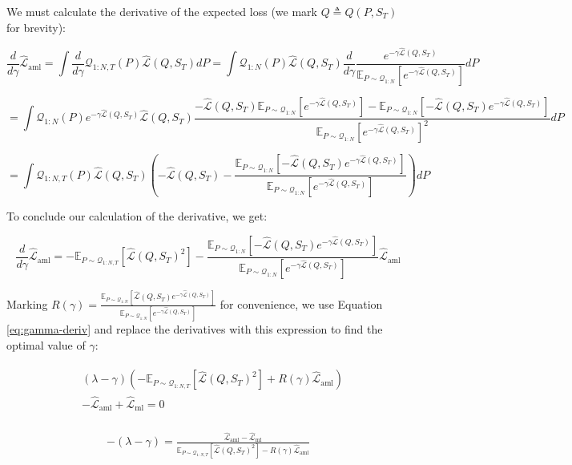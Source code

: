 \documentclass{article}
\theoremstyle{definition}
\newcommand{\Expect}[2]{\mathbb{E}_{#1}\left [#2 \right ]}
\begin{document}
We must calculate the derivative of the expected loss (we mark $Q\triangleq Q(P,S_T)$ for brevity): 

$$\frac{d}{d\gamma}\hat{\mathcal{L}}_{\mathrm{aml}}=\int \frac{d}{d\gamma}\mathcal{Q}_{1:N,T}(P)\hat{\mathcal{L}}(Q, S_T)dP=\int \mathcal{Q}_{1:N}(P)\hat{\mathcal{L}}(Q, S_T)\frac{d}{d\gamma}
\frac{e^{-\gamma\hat{\mathcal{L}}(Q,S_T)}}{\Expect{P\sim \mathcal{Q}_{1:N}}{e^{-\gamma\hat{\mathcal{L}}(Q,S_T)}}}dP$$

$$=\int \mathcal{Q}_{1:N}(P)e^{-\gamma\hat{\mathcal{L}}(Q,S_T)}\hat{\mathcal{L}}(Q, S_T)\frac{-\hat{\mathcal{L}}(Q,S_T)\Expect{P\sim \mathcal{Q}_{1:N}}{e^{-\gamma\hat{\mathcal{L}}(Q,S_T)}}
	-\Expect{P\sim \mathcal{Q}_{1:N}}{-\hat{\mathcal{L}}(Q,S_T)e^{-\gamma\hat{\mathcal{L}}(Q,S_T)} }}{\Expect{P\sim \mathcal{Q}_{1:N}}{e^{-\gamma\hat{\mathcal{L}}(Q,S_T)}}^2}dP$$


$$=\int \mathcal{Q}_{1:N,T}(P)\hat{\mathcal{L}}(Q, S_T)\left (-\hat{\mathcal{L}}(Q,S_T)-
\frac{\Expect{P\sim \mathcal{Q}_{1:N}}{-\hat{\mathcal{L}}(Q,S_T)e^{-\gamma\hat{\mathcal{L}}(Q,S_T)} }}{\Expect{P\sim \mathcal{Q}_{1:N}}{e^{-\gamma\hat{\mathcal{L}}(Q,S_T)}}}\right)dP$$

To conclude our calculation of the derivative, we get:

$$\frac{d}{d\gamma}\hat{\mathcal{L}}_{\mathrm{aml}}=-\Expect{P\sim \mathcal{Q}_{1:N,T}}{\hat{\mathcal{L}}(Q,S_T)^2}-\frac{\Expect{P\sim \mathcal{Q}_{1:N}}{-\hat{\mathcal{L}}(Q,S_T)e^{-\gamma\hat{\mathcal{L}}(Q,S_T)} }}{\Expect{P\sim \mathcal{Q}_{1:N}}{e^{-\gamma\hat{\mathcal{L}}(Q,S_T)}} }\hat{\mathcal{L}}_{\mathrm{aml}} $$

Marking $R(\gamma)=\frac{\Expect{P\sim \mathcal{Q}_{1:N}}{\hat{\mathcal{L}}(Q,S_T)e^{-\gamma\hat{\mathcal{L}}(Q,S_T)} }}{\Expect{P\sim \mathcal{Q}_{1:N}}{e^{-\gamma\hat{\mathcal{L}}(Q,S_T)}} }$ for convenience, we use Equation \ref{eq:gamma-deriv} and replace the derivatives with this expression to find the optimal value of $\gamma$: 

\begin{align*} 
\begin{split}
&(\lambda-\gamma)\left (-\Expect{P\sim \mathcal{Q}_{1:N,T}}{\hat{\mathcal{L}}(Q,S_T)^2}+R(\gamma)\hat{\mathcal{L}}_{\mathrm{aml}}\right )\\& - \hat{\mathcal{L}}_{\mathrm{aml}}+\hat{\mathcal{L}}_{\mathrm{ml}} = 0
\end{split}
\end{align*}

\begin{align*} 
\begin{split}
-(\lambda-\gamma) = \frac{\hat{\mathcal{L}}_{\mathrm{aml}}-\hat{\mathcal{L}}_{\mathrm{ml}}}{\Expect{P\sim \mathcal{Q}_{1:N,T}}{\hat{\mathcal{L}}(Q,S_T)^2}-R(\gamma)\hat{\mathcal{L}}_{\mathrm{aml}}}
\end{split}
\end{align*}
\end{document}

